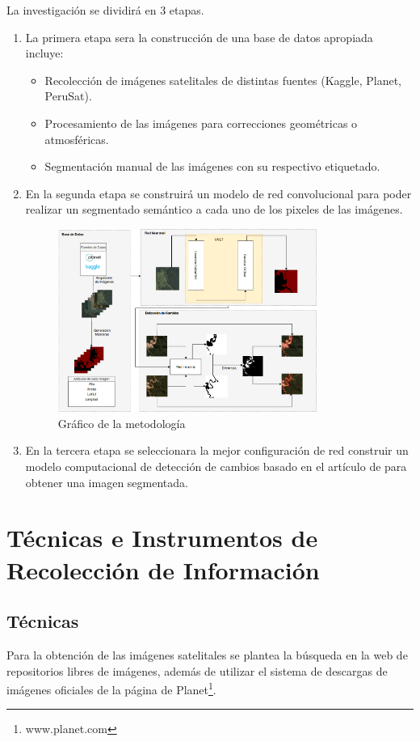 La investigación se dividirá en 3 etapas. 
\begin{enumerate}
\item La primera etapa sera la construcción de una base de datos apropiada incluye:
\begin{itemize}
 \item Recolección de imágenes satelitales de distintas fuentes (Kaggle, Planet, PeruSat).
 \item Procesamiento de las imágenes para correcciones geométricas o atmosféricas.
 \item Segmentación manual de las imágenes con su respectivo etiquetado. 
\end{itemize}
\item En la segunda etapa se construirá un modelo de red convolucional para poder realizar un segmentado semántico a cada uno de los pixeles de las imágenes.

\begin{figure}[H]
    \centering
    \includegraphics[width=0.8\textwidth]{images/ArquitecturaFinakl.png}
    \caption{Gráfico de la metodología}
    \label{fig:my_label}
\end{figure}
\item En la tercera etapa se seleccionara la mejor configuración de red construir un modelo computacional de detección de cambios basado en el artículo de \cite{doshi2018satellite} para obtener una imagen segmentada.
\end{enumerate}
\section{Técnicas e Instrumentos de Recolección de Información}

\subsection{Técnicas}
Para la obtención de las imágenes satelitales se plantea la búsqueda en la web de repositorios libres de imágenes, además de utilizar el sistema de descargas de imágenes oficiales de la página de Planet\footnote{www.planet.com}. 


